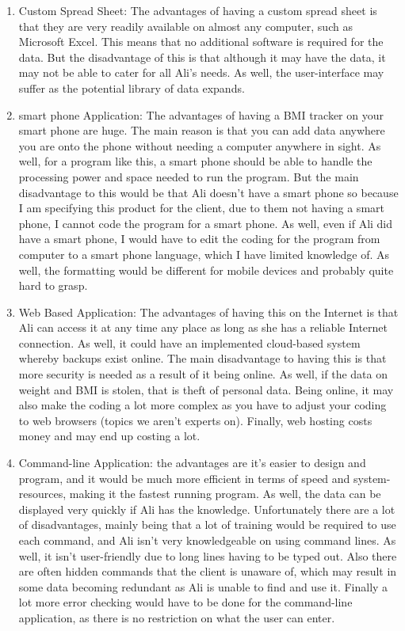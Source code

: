 \begin{enumerate}
\item Custom Spread Sheet: The advantages of having a custom spread sheet is that they are very readily available on almost any computer, such as Microsoft Excel. This means that no additional software is required for the data. But the disadvantage of this is that although it may have the data, it may not be able to cater for all Ali's needs. As well, the user-interface may suffer as the potential library of data expands.

\item smart phone Application: The advantages of having a BMI tracker on your smart phone are huge. The main reason is that you can add data anywhere you are onto the phone without needing a computer anywhere in sight. As well, for a program like this, a smart phone should be able to handle the processing power and space needed to run the program. But the main disadvantage to this would be that Ali doesn't have a smart phone so because I am specifying this product for the client, due to them not having a smart phone, I cannot code the program for a smart phone. As well, even if Ali did have a smart phone, I would have to edit the coding for the program from computer to a smart phone language, which I have limited knowledge of. As well, the formatting would be different for mobile devices and probably quite hard to grasp.

\item Web Based Application: The advantages of having this on the Internet is that Ali can access it at any time any place as long as she has a reliable Internet connection. As well, it could have an implemented cloud-based system whereby backups exist online. The main disadvantage to having this is that more security is needed as a result of it being online. As well, if the data on weight and BMI is stolen, that is theft of personal data. Being online, it may also make the coding a lot more complex as you have to adjust your coding to web browsers (topics we aren't experts on). Finally, web hosting costs money and may end up costing a lot.

\item Command-line Application: the advantages are it's easier to design and program, and it would be much more efficient in terms of speed and system-resources, making it the fastest running program. As well, the data can be displayed very quickly if Ali has the knowledge. Unfortunately there are a lot of disadvantages, mainly being that a lot of training would be required to use each command, and Ali isn't very knowledgeable on using command lines. As well, it isn't user-friendly due to long lines having to be typed out. Also there are often hidden commands that the client is unaware of, which may result in some data becoming redundant as Ali is unable to find and use it.  Finally a lot more error checking would have to be done for the command-line application, as there is no restriction on what the user can enter.


\end{enumerate}
